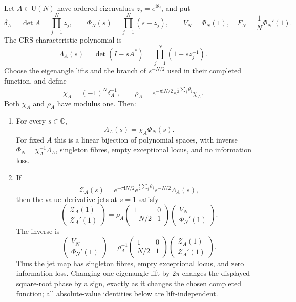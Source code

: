 \begin{theorem}
\label{thm:crs-first-jet-crosswalk}
Let $A\in\mathrm U(N)$ have ordered eigenvalues
$z_j=e^{\mathrm i\theta_j}$, and put
\[
 \delta_A=\det A=\prod_{j=1}^{N}z_j,\qquad
 \Phi_N(s)=\prod_{j=1}^{N}(s-z_j),\qquad
 V_N=\Phi_N(1),\quad F_N=\frac1N\Phi_N'(1).
\]
The CRS characteristic polynomial is
\[
 \Lambda_A(s)=\det(I-sA^*)=\prod_{j=1}^{N}(1-sz_j^{-1}).
\]
Choose the eigenangle lifts and the branch of $s^{-N/2}$ used in their
completed function, and define
\[
 \chi_A=(-1)^N\delta_A^{-1},\qquad
 \rho_A=e^{-\pi\mathrm iN/2}
 e^{\frac{\mathrm i}{2}\sum_j\theta_j}\chi_A .
\]
Both $\chi_A$ and $\rho_A$ have modulus one.  Then:

\begin{enumerate}
 \item For every $s\in\mathbb C$,
 \begin{equation}
  \Lambda_A(s)=\chi_A\Phi_N(s).
  \label{eq:crs-polynomial-phase-map}
 \end{equation}
 For fixed $A$ this is a linear bijection of polynomial spaces, with inverse
 $\Phi_N=\chi_A^{-1}\Lambda_A$, singleton fibres, empty exceptional locus, and no
 information loss.

 \item If
 \[
  \mathcal Z_A(s)=e^{-\pi\mathrm iN/2}
  e^{\frac{\mathrm i}{2}\sum_j\theta_j}s^{-N/2}\Lambda_A(s),
 \]
 then the value--derivative jets at $s=1$ satisfy
 \begin{equation}
  \begin{pmatrix}\mathcal Z_A(1)\\ \mathcal Z_A'(1)\end{pmatrix}
  =
  \rho_A
  \begin{pmatrix}1&0\\ -N/2&1\end{pmatrix}
  \begin{pmatrix}V_N\\ \Phi_N'(1)\end{pmatrix}.
  \label{eq:crs-completed-jet-map}
 \end{equation}
 The inverse is
 \begin{equation}
  \begin{pmatrix}V_N\\ \Phi_N'(1)\end{pmatrix}
  =
  \rho_A^{-1}
  \begin{pmatrix}1&0\\ N/2&1\end{pmatrix}
  \begin{pmatrix}\mathcal Z_A(1)\\ \mathcal Z_A'(1)\end{pmatrix}.
  \label{eq:crs-completed-jet-inverse}
 \end{equation}
 Thus the jet map has singleton fibres, empty exceptional locus, and zero information
 loss.  Changing one eigenangle lift by $2\pi$ changes the displayed square-root phase
 by a sign, exactly as it changes the chosen completed function; all absolute-value
 identities below are lift-independent.


\end{enumerate}
\end{theorem}
